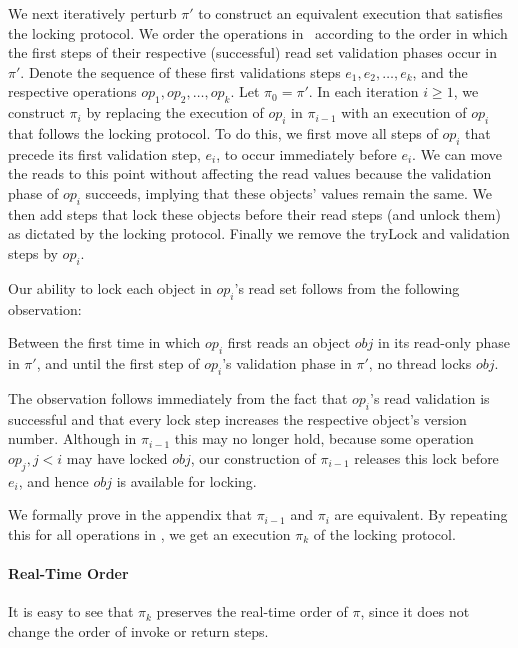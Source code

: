 We next iteratively perturb $\pi'$ to construct an equivalent execution that satisfies the locking protocol.
We order the operations in \op\ according to the order in which the first steps of their 
respective (successful) read set validation phases occur in $\pi'$.
Denote the sequence of these first validations steps $e_1, e_2, \ldots, e_k$, and the respective operations
$op_1, op_2, \ldots, op_k$. Let $\pi_0 = \pi'$. 
In each iteration $i \geq 1$, we construct $\pi_i$ by replacing the execution of $op_i$
in $\pi_{i-1}$ with an execution of $op_i$ that follows the locking protocol. To do this, we first move all steps of $op_i$ that precede 
its first validation step, $e_i$, to occur immediately before $e_i$. We can move the reads to this point without affecting the read
values because the validation phase of $op_i$ succeeds, implying that these objects' values remain the same. 
 We then add steps that lock these objects before their read steps (and unlock
them) as dictated by the locking protocol.
Finally we remove the tryLock and validation steps by $op_i$. 

Our ability to lock each object in $op_i$'s read set follows from the following observation:
\begin{observation}
Between the first time in which $op_i$ first reads an object $obj$ in its read-only phase in $\pi'$, 
and until the first step of $op_i$'s validation phase in $\pi'$, no thread locks $obj$. 
\end{observation}
The observation follows immediately from the fact that $op_i$'s read validation is successful and that every lock step increases the
respective object's version number. Although in $\pi_{i-1}$ this may no longer hold, because some operation $op_j, j < i$ may 
have locked $obj$, our construction of $\pi_{i-1}$ releases this lock before $e_i$, and hence $obj$ is available for locking. 

We formally prove in the appendix that $\pi_{i-1}$ and $\pi_i$ are equivalent. 
By repeating this for all operations in \op, we get an execution $\pi_k$ of the locking protocol.

\paragraph{Real-Time Order}
It is easy to see that $\pi_k$ preserves the real-time order of $\pi$, since it does not change the order of invoke or return steps. 

